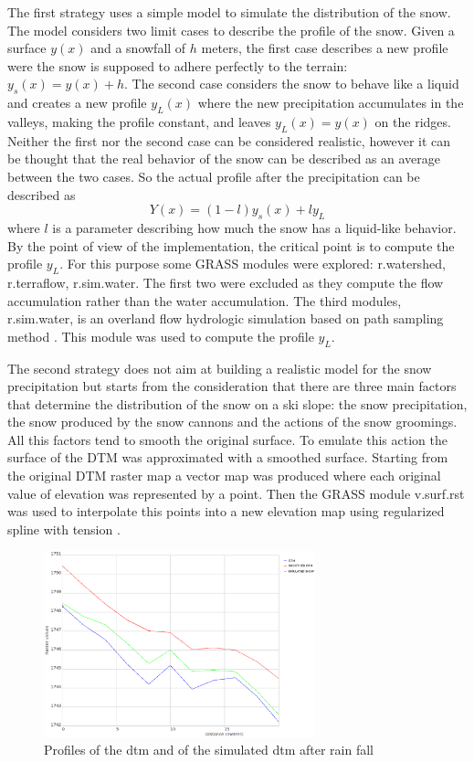 \documentclass[12pt,a4paper,twoside]{book}
\begin{document}
The first strategy uses a simple model to simulate the distribution of the snow. The model considers two limit cases to describe the profile of the snow. Given a surface $y(x)$ and a snowfall of $h$ meters, the first case describes a new profile were the snow is supposed to adhere perfectly to the terrain: $y_s(x)=y(x)+h$. The second case considers the snow to behave like a liquid and creates a new profile $y_L(x)$ where the new precipitation accumulates in the valleys, making the profile constant, and leaves $y_L(x)=y(x)$ on the ridges. Neither the first nor the second case can be considered realistic, however it can be thought that the real behavior of the snow can be described as an average between the two cases. So the actual profile after the precipitation can be described as
\begin{equation}
Y(x)=(1-l)y_s(x)+ly_L
\end{equation}
where $l$ is a parameter describing how much the snow has a liquid-like behavior. By the point of view of the implementation, the critical point is to compute the profile $y_L$. For this purpose some GRASS modules were explored: r.watershed, r.terraflow, r.sim.water. The first two were excluded as they compute the flow accumulation rather than the water accumulation. The third modules, r.sim.water, is an overland flow hydrologic simulation based on path sampling method \cite{mit2004}. This module was used to compute the profile $y_L$.

The second strategy does not aim at building a realistic model for the snow precipitation but starts from the consideration that there are three main factors that determine the distribution of the snow on a ski slope: the snow precipitation, the snow produced by the snow cannons and the actions of the snow groomings. All this factors tend to smooth the original surface. To emulate this action the surface of the DTM was approximated with a smoothed surface. Starting from the original DTM raster map a vector map was produced where each original value of elevation was represented by a point. Then the GRASS module v.surf.rst was used to interpolate this points into a new elevation map using regularized spline with tension \cite{mit2005}.

\begin{figure}[!h]
  \centering
    \includegraphics[width=0.7\textwidth]{images/profiles_dtm.eps}
    \caption{Profiles of the dtm and of the simulated dtm after rain fall}\label{profile_dtm}
\end{figure}
\end{document}
